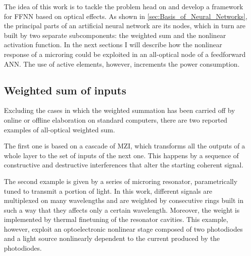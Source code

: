 The idea of this work is to tackle the problem head on and develop a framework for \ac{FFNN} based on optical effects.
As shown in \autoref{sec:Basis_of_Neural_Networks}, the principal parts of an artificial neural network are its nodes, which in turn are built by two separate subcomponents: the weighted sum and the nonlinear activation function.
In the next sections I will describe how the nonlinear response of a microring could be exploited in an all-optical node of a feedforward \ac{ANN}.
The use of active elements, however, increments the power consumption.


\subsection{Weighted sum of inputs}
\label{ssec:Weighted_Sum_of_inputs}
Excluding the cases in which the weighted summation has been carried off by online or offline elaboration on standard computers, there are two reported examples of all-optical weighted sum.

The first one \cite{Shen2017} is based on a cascade of \acf{MZI}, which transforms all the outputs of a whole layer to the set of inputs of the next one.
This happens by a sequence of constructive and destructive interferences that alter the starting coherent signal.

The second example \cite{Tait2017} is given by a series of microring resonator, parametrically tuned to transmit a portion of light.
In this work, different signals are multiplexed on many wavelengths and are weighted by consecutive rings built in such a way that they affects only a certain wavelength.
Moreover, the weight is implemented by thermal finetuning of the resonator cavities.
This example, however, exploit an optoelectronic nonlinear stage composed of two photodiodes and a light source nonlinearly dependent to the current produced by the photodiodes.

